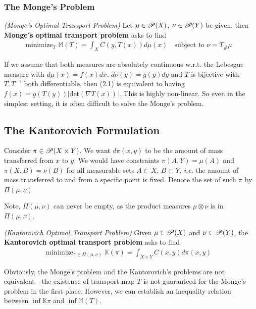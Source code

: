 \documentclass[12pt,a4paper]{article}
\begin{document}
\subsubsection*{The Monge's Problem}

 \emph{(Monge's Optimal Transport Problem)} Let $\mu \in \mathscr{P} (X)$, $\nu \in \mathscr{P}(Y)$ be given, then \textbf{Monge's optimal transport problem} asks to find
\begin{align*}
\text{minimize}_T \,\,\mathbb{M}(T) = \int_X C(y, T(x)) d\mu(x) \quad \text{subject to } \nu = T_{\#} \mu
\end{align*}
\s

If we assume that both measures are absolutely continuous w.r.t. the Lebesgue measure with $d\mu(x) = f(x)dx$, $d\nu(y) = g(y)dy$ and $T$ is bijective with $T, T^{-1}$ both differentiable, then (2.1) is equivalent to having $f(x) = g(T(y)) |\text{det}(\nabla T(x))|$. This is highly non-linear. So even in the simplest setting, it is often difficult to solve the Monge's problem.

\subsection{The Kantorovich Formulation}

Consider $\pi \in \mathscr{P}(X\times Y)$. We want $d\pi(x,y)$ to be the amount of mass transferred from $x$ to $y$. We would have constraints $\pi(A, Y) = \mu(A)$ and $\pi(X, B) = \nu(B)$ for all measurable sets $A\subset X$, $B\subset Y$, \textit{i.e.} the amount of mass transferred to and from a specific point is fixed. Denote the set of such $\pi$ by $\Pi(\mu,\nu)$

Note, $\Pi(\mu, \nu)$ can never be empty, as the product measures $\mu \otimes \nu$ is in $\Pi(\mu, \nu)$.
\s

 \emph{(Kantorovich Optimal Transport Problem)} Given $\mu \in \mathscr{P}(X)$ and $\nu \in \mathscr{P}(Y)$, the \textbf{Kantorovich optimal transport problem} asks to find 
\begin{align*}
\text{minimize}_{\pi \in \Pi(\mu, \nu)} \,\, \mathbb{K}(\pi) = \int_{X\times Y} C(x,y) d\pi(x,y)
\end{align*}
\s

Obviously, the Monge's problem and the Kantorovich's problems are not equivalent - the existence of transport map $T$ is not guaranteed for the Monge's problem in the first place. However, we can establish an inequality relation between $\inf \mathbb{K}{\pi}$ and $\inf \mathbb{M}(T)$.
\end{document}
